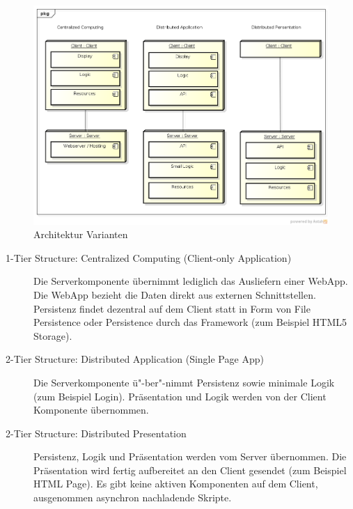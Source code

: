 		\begin{figure}[H]
			\includegraphics[width=\textwidth]{architecture/media/img/tierArchitecture.png}
			\centering
			\caption{Architektur Varianten}
			\label{fig:tierArchitecture}
		\end{figure}
		\begin{description}
			\item[1-Tier Structure: Centralized Computing (Client-only Application)]
				Die Serverkomponente übernimmt lediglich das Ausliefern einer WebApp. 
				Die WebApp bezieht die Daten direkt aus externen Schnittstellen. 
				Persistenz findet dezentral auf dem Client statt in Form von File Persistence oder 
				Persistence durch das Framework (zum Beispiel HTML5 Storage).
				
			\item[2-Tier Structure: Distributed Application (Single Page App)]
				Die Serverkomponente ü"-ber"-nimmt Persistenz sowie minimale Logik (zum Beispiel Login).
				Präsentation und Logik werden von der Client Komponente übernommen.
				
			\item[2-Tier Structure: Distributed Presentation]
				Persistenz, Logik und Präsentation werden vom Server übernommen.
				Die Präsentation wird fertig aufbereitet an den Client gesendet (zum Beispiel HTML Page).
				Es gibt keine aktiven Komponenten auf dem Client, ausgenommen asynchron nachladende Skripte.				
		\end{description}
	
